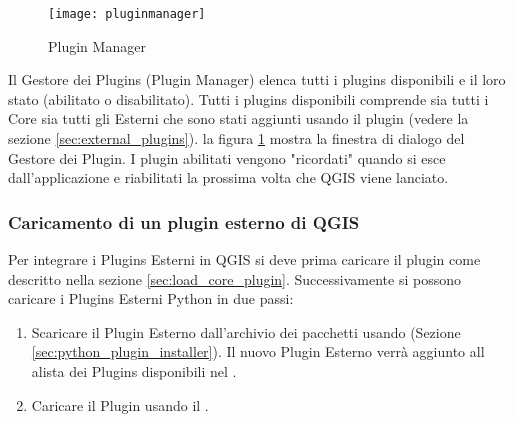 \begin{figure}[ht]
   \begin{center}
   \caption{Plugin Manager \nixcaption}\label{fig:pluginmanager}\smallskip
   \texttt{[image: pluginmanager]}
\end{center}
\end{figure}

Il Gestore dei Plugins (Plugin Manager) elenca tutti i plugins disponibili e il loro stato (abilitato o disabilitato).
Tutti i plugins disponibili comprende sia tutti i Core sia tutti gli Esterni che sono stati aggiunti usando il plugin  (vedere la sezione \ref{sec:external_plugins}).
la figura \ref{fig:pluginmanager} mostra la finestra di dialogo del Gestore dei Plugin.
I plugin abilitati vengono "ricordati" quando si esce dall'applicazione e riabilitati la prossima volta che QGIS viene lanciato.

\begin{Tip}\caption{\textsc{Il Crash dei Plugins}}
\end{Tip} 

\subsubsection{Caricamento di un plugin esterno di QGIS}\label{sec:load_external_plugin} 

Per integrare i Plugins Esterni in QGIS si deve prima caricare il plugin  come descritto nella sezione \ref{sec:load_core_plugin}.
Successivamente si possono caricare i Plugins Esterni Python in due passi: 

\begin{enumerate}
\item Scaricare il Plugin Esterno dall'archivio dei pacchetti usando   (Sezione \ref{sec:python_plugin_installer}).
Il nuovo Plugin Esterno verrà aggiunto all alista dei Plugins disponibili nel .
\item Caricare il Plugin usando il .
\end{enumerate}

